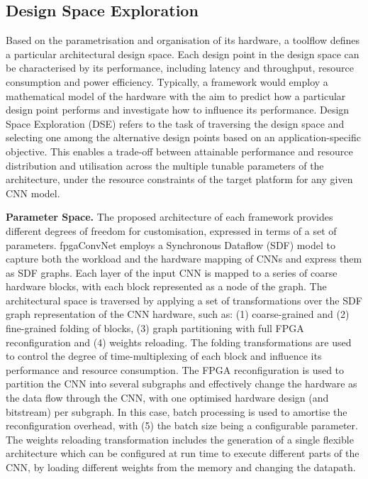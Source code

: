 \documentclass[format=acmsmall, review=false, screen=true]{acmart}
\begin{document}
	

\subsection{Design Space Exploration}
\label{param_space_section}
Based on the parametrisation and organisation of its hardware, a toolflow defines a particular architectural design space. Each design point in the design space can be characterised by its performance, including latency and throughput, resource consumption and power efficiency. Typically, a framework would employ a mathematical model of the hardware with the aim to predict how a particular design point performs and investigate how to influence its performance. Design Space Exploration (DSE) refers to the task of traversing the design space and selecting one among the alternative design points based on an application-specific objective. This enables a trade-off between attainable performance and resource distribution and utilisation across the multiple tunable parameters of the architecture, under the resource constraints of the target platform for any given CNN model. 


\textbf{Parameter Space.} The proposed architecture of each framework provides different degrees of freedom for customisation, expressed in terms of a set of parameters. fpgaConvNet employs a Synchronous Dataflow (SDF) model \cite{Lee_1987} to capture both the workload and the hardware mapping of CNNs and express them as SDF graphs. Each layer of the input CNN is mapped to a series of coarse hardware blocks, with each block represented as a node of the graph. The architectural space is traversed by applying a set of transformations over the SDF graph representation of the CNN hardware, such as: (1) coarse-grained and (2) fine-grained folding of blocks, (3) graph partitioning with full FPGA reconfiguration and (4) weights reloading. The folding transformations are used to control the degree of time-multiplexing of each block and influence its performance and resource consumption. The FPGA reconfiguration is used to partition the CNN into several subgraphs and effectively change the hardware as the data flow through the CNN, with one optimised hardware design (and bitstream) per subgraph. In this case, batch processing is used to amortise the reconfiguration overhead, with (5) the batch size being a configurable parameter. The weights reloading transformation includes the generation of a single flexible architecture which can be configured at run time to execute different parts of the CNN, by loading different weights from the memory and changing the datapath. 
\end{document}
